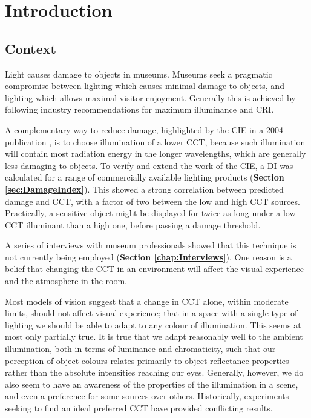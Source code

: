 \chapter{Introduction}
\label{chapterlabel1}

\section{Context}
Light causes damage to objects in museums. Museums seek a pragmatic compromise between lighting which causes minimal damage to objects, and lighting which allows maximal visitor enjoyment. Generally this is achieved by following industry recommendations for maximum illuminance and \gls{CRI}.

A complementary way to reduce damage, highlighted by the \gls{CIE} in a 2004 publication \citep{cie_cie_2004}, is to choose illumination of a lower \gls{CCT}, because such illumination will contain most radiation energy in the longer wavelengths, which are generally less damaging to objects. To verify and extend the work of the \gls{CIE}, a \gls{DI} was calculated for a range of commercially available lighting products (\textbf{Section \ref{sec:DamageIndex}}). This showed a strong correlation between predicted damage and \gls{CCT}, with a factor of two between the low and high \gls{CCT} sources. Practically, a sensitive object might be displayed for twice as long under a low \gls{CCT} illuminant than a high one, before passing a damage threshold. 

A series of interviews with museum professionals showed that this technique is not currently being employed (\textbf{Section \ref{chap:Interviews}}). One reason is a belief that changing the \gls{CCT} in an environment will affect the visual experience and the atmosphere in the room.

Most models of vision suggest that a change in \gls{CCT} alone, within moderate limits, should not affect visual experience; that in a space with a single type of lighting we should be able to adapt to any colour of illumination. This seems at most only partially true. It is true that we adapt reasonably well to the ambient illumination, both in terms of luminance and chromaticity, such that our perception of object colours relates primarily to object reflectance properties rather than the absolute intensities reaching our eyes. Generally, however, we do also seem to have an awareness of the properties of the illumination in a scene, and even a preference for some sources over others. Historically, experiments seeking to find an ideal preferred \gls{CCT} have provided conflicting results.

